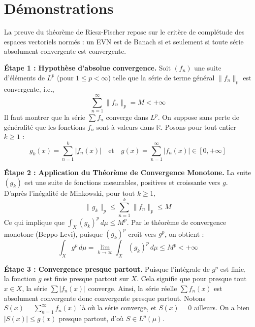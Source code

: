 \documentclass[11pt,a4paper]{article}
\begin{document}
\begin{center}
\end{center}


\section{Démonstrations}

La preuve du théorème de Riesz-Fischer repose sur le critère de complétude des espaces vectoriels normés : un EVN est de Banach si et seulement si toute série absolument convergente est convergente.

\textbf{Étape 1 : Hypothèse d'absolue convergence.}
Soit $(f_n)$ une suite d'éléments de $L^p$ (pour $1 \le p < \infty$) telle que la série de terme général $\|f_n\|_p$ est convergente, i.e.,
$$ \sum_{n=1}^\infty \|f_n\|_p = M < +\infty $$
Il faut montrer que la série $\sum f_n$ converge dans $L^p$. On suppose sans perte de généralité que les fonctions $f_n$ sont à valeurs dans $\mathbb{R}$. Posons pour tout entier $k \ge 1$ :
$$ g_k(x) = \sum_{n=1}^k |f_n(x)| \quad \text{et} \quad g(x) = \sum_{n=1}^\infty |f_n(x)| \in [0, +\infty] $$

\textbf{Étape 2 : Application du Théorème de Convergence Monotone.}
La suite $(g_k)$ est une suite de fonctions mesurables, positives et croissante vers $g$.
D'après l'inégalité de Minkowski, pour tout $k \ge 1$,
$$ \|g_k\|_p \le \sum_{n=1}^k \|f_n\|_p \le M $$
Ce qui implique que $\int_X (g_k)^p \, d\mu \le M^p$.
Par le théorème de convergence monotone (Beppo-Levi), puisque $(g_k)^p$ croît vers $g^p$, on obtient :
$$ \int_X g^p \, d\mu = \lim_{k \to \infty} \int_X (g_k)^p \, d\mu \le M^p < +\infty $$

\textbf{Étape 3 : Convergence presque partout.}
Puisque l'intégrale de $g^p$ est finie, la fonction $g$ est finie presque partout sur $X$.
Cela signifie que pour presque tout $x \in X$, la série $\sum |f_n(x)|$ converge. Ainsi, la série réelle $\sum f_n(x)$ est absolument convergente donc convergente presque partout.
Notons $S(x) = \sum_{n=1}^\infty f_n(x)$ là où la série converge, et $S(x) = 0$ ailleurs.
On a bien $|S(x)| \le g(x)$ presque partout, d'où $S \in L^p(\mu)$.
\end{document}
